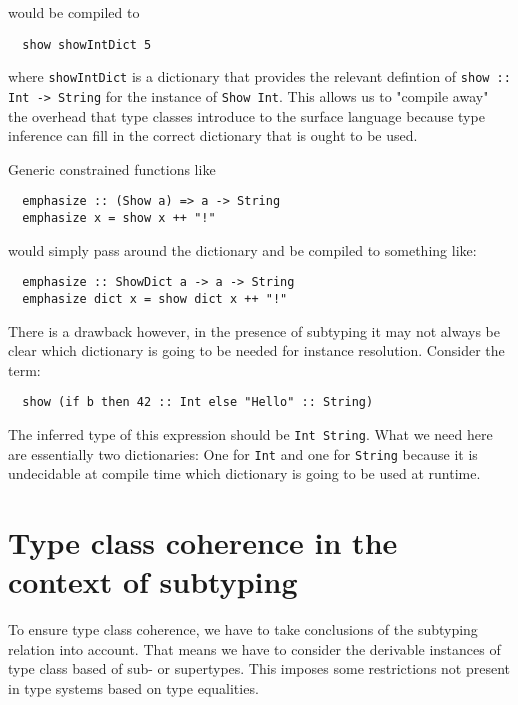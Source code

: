 would be compiled to

\begin{verbatim}
  show showIntDict 5
\end{verbatim}

where \texttt{showIntDict} is a dictionary that provides the relevant defintion of \texttt{show :: Int -> String} for the instance of \texttt{Show Int}.
This allows us to "compile away" the overhead that type classes introduce to the surface language because type inference can fill in the correct dictionary that is ought to be used.

Generic constrained functions like

\begin{verbatim}
  emphasize :: (Show a) => a -> String
  emphasize x = show x ++ "!"
\end{verbatim}

would simply pass around the dictionary and be compiled to something like:

\begin{verbatim}
  emphasize :: ShowDict a -> a -> String
  emphasize dict x = show dict x ++ "!"
\end{verbatim}

\cite{kiselyov}

There is a drawback however, in the presence of subtyping it may not always be clear which dictionary is going to be needed for instance resolution.
Consider the term:

\begin{verbatim}
  show (if b then 42 :: Int else "Hello" :: String)
\end{verbatim}

The inferred type of this expression should be \texttt{Int \/ String}.
What we need here are essentially two dictionaries: One for \texttt{Int} and one for \texttt{String} because it is undecidable at compile time which dictionary is going to be used at runtime.


\section{Type class coherence in the context of subtyping}
To ensure type class coherence, we have to take conclusions of the subtyping relation into account.
That means we have to consider the derivable instances of type class based of sub- or supertypes.
This imposes some restrictions not present in type systems based on type equalities.

